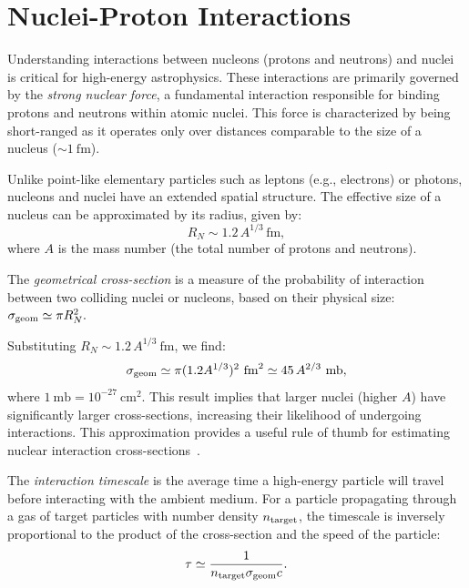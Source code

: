 \section{Nuclei-Proton Interactions}

Understanding interactions between nucleons (protons and neutrons) and nuclei is critical for high-energy astrophysics. These interactions are primarily governed by the \emph{strong nuclear force}, a fundamental interaction responsible for binding protons and neutrons within atomic nuclei. This force is characterized by being short-ranged as it operates only over distances comparable to the size of a nucleus (\( \sim 1~\text{fm}\)). 

Unlike point-like elementary particles such as leptons (e.g., electrons) or photons, nucleons and nuclei have an extended spatial structure. The effective size of a nucleus can be approximated by its radius, given by:
\begin{equation}
R_N \sim 1.2 \, A^{1/3} \, \text{fm},
\end{equation}
where \(A\) is the mass number (the total number of protons and neutrons). 

The \emph{geometrical cross-section} is a measure of the probability of interaction between two colliding nuclei or nucleons, based on their physical size:
\(
\sigma_{\rm geom} \simeq \pi R_N^2.
\)

Substituting \(R_N \sim 1.2 \, A^{1/3}~\text{fm}\), we find:
\begin{equation}
\sigma_{\rm geom} \simeq \pi (1.2 A^{1/3})^2~\text{fm}^2 \simeq 45 \, A^{2/3}~\text{mb},
\end{equation}
where \(1~\text{mb} = 10^{-27}~\text{cm}^2\). This result implies that larger nuclei (higher \(A\)) have significantly larger cross-sections, increasing their likelihood of undergoing interactions. This approximation provides a useful rule of thumb for estimating nuclear interaction cross-sections~\cite{Letaw1983apjs}. 

The \emph{interaction timescale} is the average time a high-energy particle will travel before interacting with the ambient medium. For a particle propagating through a gas of target particles with number density \(n_{\rm target}\), the timescale is inversely proportional to the product of the cross-section and the speed of the particle:
\begin{equation}
\tau \simeq \frac{1}{n_{\rm target} \sigma_{\rm geom} c}.
\end{equation}

